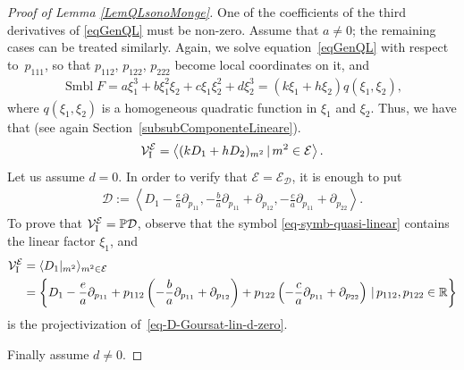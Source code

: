 \documentclass[10pt,a4paper]{amsart}
\newcommand{\D}{\mathcal{D}}
\newcommand{\MM}{\mathcal{V}_{\textrm{\normalfont I}}}
\newcommand{\E}{\mathcal{E}}
\newcommand{\Span}[1]{\left\langle #1 \right\rangle}
\renewcommand{\P}{\mathbb{P}}
\numberwithin{equation}{section}
\begin{document}
\begin{proof}[Proof of Lemma \ref{LemQLsonoMonge}]
One of the coef\/f\/icients of the third derivatives of \eqref{eqGenQL} must be non-zero. Assume that $a\neq 0$; the remaining cases can be treated similarly. Again, we solve equation~\eqref{eqGenQL} with respect to~$p_{111}$, so that $p_{112}$, $p_{122}$, $p_{222}$ become local coordinates on it, and
\begin{gather} \label{eq-symb-quasi-linear}
\operatorname{Smbl} F=a\xi_1^3+b\xi_1^2\xi_2+c\xi_1\xi_2^2+d\xi_2^3=(k\xi_1+h\xi_2)q(\xi_1,\xi_2),
\end{gather}
where $q(\xi_1,\xi_2)$ is a homogeneous quadratic function in $\xi_1$ and $\xi_2$. Thus, we have that (see again Section~\ref{subsubComponenteLineare}).
\begin{gather} \label{eq-MME-Goursat-linear}
\MM^\E=\Span{ (kD_1+hD_2)_{m^2} \,|\, m^2\in\E}.
\end{gather}
%
Let us assume $d=0$.
In order to verify that $\E=\E_\D$, it is enough to put
\begin{gather}\label{eq-D-Goursat-lin-d-zero}
\D:= \Span{ D_1-\frac{e}{a}\partial_{p_{11}}, -\frac{b}{a}\partial_{p_{11}}+\partial_{p_{12}}, -\frac{c}{a}\partial_{p_{11}}+\partial_{p_{22}}}.
\end{gather}
To prove that $\MM^\E=\P\D$, observe that the symbol \eqref{eq-symb-quasi-linear} contains the linear factor $\xi_1$, and
\begin{align*}
\MM^\E&=\langle {D_1}|_{m^2} \rangle_{m^2\in\E } \\
&=\left\{D_1-\frac{e}{a}\partial_{p_{11}}+p_{112}\left(-\frac{b}{a}\partial_{p_{11}}+\partial_{p_{12}}\right) + p_{122}\left(-\frac{c}{a}\partial_{p_{11}}+\partial_{p_{22}}\right)\,|\, p_{112},p_{122}\in\mathbb{R}\right\}
\end{align*}
is the projectivization of~\eqref{eq-D-Goursat-lin-d-zero}.

Finally assume $d\neq 0$.


\end{proof}
\end{document}

